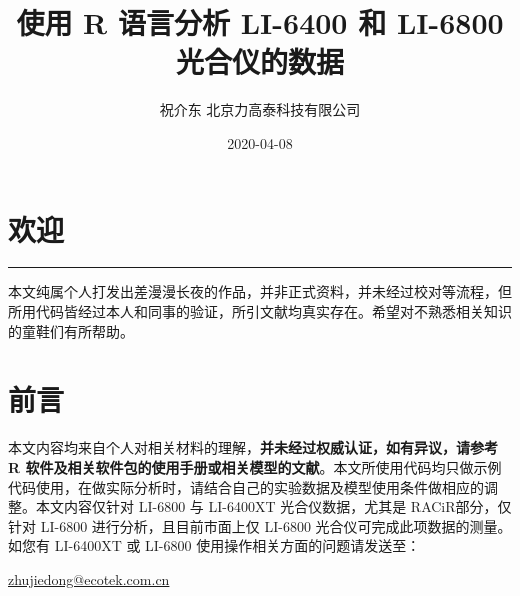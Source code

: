 \documentclass[
]{krantz}
\title{使用 R 语言分析 LI-6400 和 LI-6800 光合仪的数据}
\author{祝介东 北京力高泰科技有限公司}
\date{2020-04-08}
\begin{document}
\maketitle





\thispagestyle{empty}

\setlength{\abovedisplayskip}{-5pt}
\setlength{\abovedisplayshortskip}{-5pt}

{
\hypersetup{linkcolor=}
\setcounter{tocdepth}{2}
\tableofcontents
}
\listoftables
\listoffigures
\hypertarget{welcome}{%
\chapter*{欢迎}\label{welcome}}


\begin{center}\rule{0.5\linewidth}{0.5pt}\end{center}

本文纯属个人打发出差漫漫长夜的作品，并非正式资料，并未经过校对等流程，但所用代码皆经过本人和同事的验证，所引文献均真实存在。希望对不熟悉相关知识的童鞋们有所帮助。

\frontmatter

\hypertarget{frontmatter}{%
\chapter*{前言}\label{frontmatter}}


本文内容均来自个人对相关材料的理解，\textbf{并未经过权威认证，如有异议，请参考 R 软件及相关软件包的使用手册或相关模型的文献}。本文所使用代码均只做示例代码使用，在做实际分析时，请结合自己的实验数据及模型使用条件做相应的调整。本文内容仅针对
LI-6800 与 LI-6400XT 光合仪数据，尤其是 RACiR\texttrademark 部分，仅针对 LI-6800
进行分析，且目前市面上仅 LI-6800 光合仪可完成此项数据的测量。如您有 LI-6400XT 或 LI-6800 使用操作相关方面的问题请发送至：

\url{zhujiedong@ecotek.com.cn}
\end{document}
